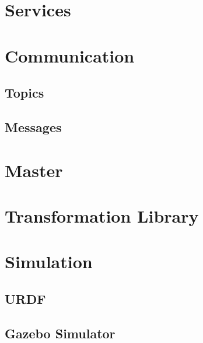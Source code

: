 \section{Services}



\section{Communication}

\subsection{Topics}

\subsection{Messages}



\section{Master}



\section{Transformation Library}



\section{Simulation}



\subsection{URDF}



\subsection{Gazebo Simulator}



\filbreak